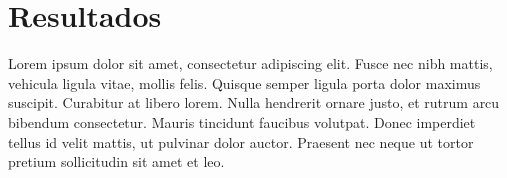 \section{Resultados}

Lorem ipsum dolor sit amet, consectetur adipiscing elit. Fusce nec nibh mattis, vehicula ligula vitae, mollis felis. Quisque semper ligula porta dolor maximus suscipit. Curabitur at libero lorem. Nulla hendrerit ornare justo, et rutrum arcu bibendum consectetur. Mauris tincidunt faucibus volutpat. Donec imperdiet tellus id velit mattis, ut pulvinar dolor auctor. Praesent nec neque ut tortor pretium sollicitudin sit amet et leo.

